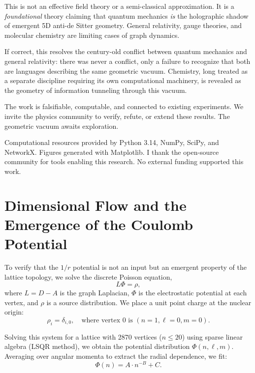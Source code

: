 \documentclass[aps,prd,twocolumn,superscriptaddress,groupedaddress,showpacs]{revtex4-2}
\begin{document}
This is not an effective field theory or a semi-classical approximation. It is a \emph{foundational} theory claiming that quantum mechanics \emph{is} the holographic shadow of emergent 5D anti-de Sitter geometry. General relativity, gauge theories, and molecular chemistry are limiting cases of graph dynamics.

If correct, this resolves the century-old conflict between quantum mechanics and general relativity: there was never a conflict, only a failure to recognize that both are languages describing the same geometric vacuum. Chemistry, long treated as a separate discipline requiring its own computational machinery, is revealed as the geometry of information tunneling through this vacuum.

The work is falsifiable, computable, and connected to existing experiments. We invite the physics community to verify, refute, or extend these results. The geometric vacuum awaits exploration.

\begin{acknowledgments}
Computational resources provided by Python 3.14, NumPy, SciPy, and NetworkX. Figures generated with Matplotlib. I thank the open-source community for tools enabling this research. No external funding supported this work.
\end{acknowledgments}

\appendix

\section{Dimensional Flow and the Emergence of the Coulomb Potential}
\label{app:greens}

To verify that the $1/r$ potential is not an input but an emergent property of the lattice topology, we solve the discrete Poisson equation,
\begin{equation}
L \Phi = \rho,
\end{equation}
where $L = D - A$ is the graph Laplacian, $\Phi$ is the electrostatic potential at each vertex, and $\rho$ is a source distribution. We place a unit point charge at the nuclear origin:
\begin{equation}
\rho_i = \delta_{i,0}, \quad \text{where vertex 0 is } (n=1, \ell=0, m=0).
\end{equation}

Solving this system for a lattice with 2870 vertices ($n \leq 20$) using sparse linear algebra (LSQR method), we obtain the potential distribution $\Phi(n, \ell, m)$. Averaging over angular momenta to extract the radial dependence, we fit:
\begin{equation}
\Phi(n) = A \cdot n^{-B} + C.
\end{equation}
\end{document}
